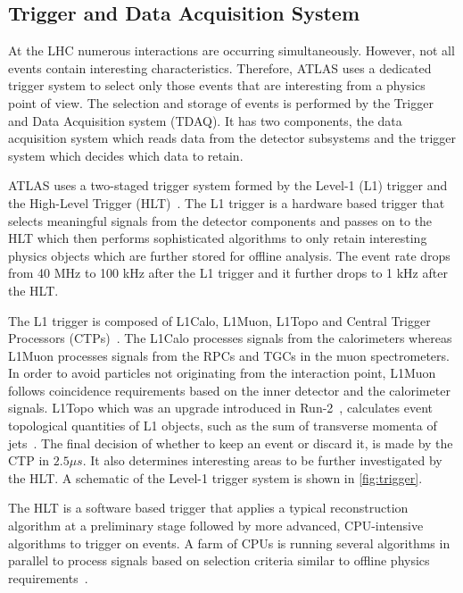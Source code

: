 \subsection{Trigger and Data Acquisition System}
At the LHC numerous interactions are occurring simultaneously. However, not all events contain
interesting characteristics. Therefore, ATLAS uses a dedicated trigger system to select only those
events that are interesting from a physics point of view. The selection and storage of events is 
performed by the Trigger and Data Acquisition system (TDAQ). It has two components, the data acquisition
system which reads data from the detector subsystems and the trigger system which decides which data 
to retain.
 
ATLAS uses a two-staged trigger system formed by the Level-1 (L1) trigger and the High-Level Trigger (HLT)~\cite{The-ATLAS-collaboration_2020}. The
L1 trigger is a hardware based trigger that selects meaningful signals from the detector components and passes on 
to the HLT which then performs sophisticated algorithms to only retain interesting physics objects 
which are further stored for offline analysis. The event rate drops from 40 MHz to 100 kHz after the L1 trigger and 
it further drops to 1 kHz after the HLT.

The L1 trigger is composed of L1Calo, L1Muon, L1Topo and Central Trigger 
Processors (CTPs)~\cite{Buttinger_2012}. The L1Calo processes signals from the calorimeters whereas 
L1Muon processes signals from the RPCs and TGCs in the
muon spectrometers. In order to avoid particles not originating from the interaction point, L1Muon 
follows coincidence requirements based on the inner detector and the calorimeter signals. L1Topo which 
was an upgrade introduced in Run-2~\cite{Simioni_2015}, calculates event topological quantities of L1 objects, such as the 
sum of transverse momenta of jets~\cite{Nakahama_2015}. The final decision of whether to keep an event 
or discard it, is made by the CTP in $2.5 \mu s$. It also determines interesting areas to be further 
investigated by the HLT. A schematic of the Level-1 trigger system is shown in \cref{fig:trigger}.

The HLT is a software based trigger that applies a typical reconstruction algorithm at a preliminary stage 
followed by more advanced, CPU-intensive algorithms to trigger on events. A farm of CPUs is running several
algorithms in parallel to process signals based on selection criteria similar to offline physics requirements~\cite{C-Gabaldon_2012}.   

